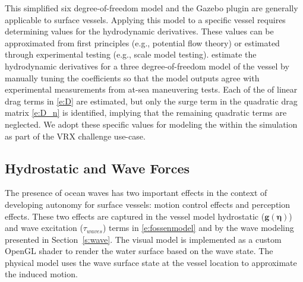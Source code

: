 \documentclass[utf8]{frontiersSCNS} %
\begin{document}
This simplified six degree-of-freedom model and the Gazebo plugin are generally applicable to surface vessels. Applying this model to a specific vessel requires determining values for the hydrodynamic derivatives. These values can be approximated from first principles (e.g., potential flow theory) or estimated through experimental testing (e.g., scale model testing). \citet{sarda16station} estimate the hydrodynamic derivatives for a three degree-of-freedom model of the \wamv{} vessel by manually tuning the coefficients so that the model outputs agree with experimental measurements from at-sea maneuvering tests. Each of the of linear drag terms in  \eqref{e:D} are estimated, but only the surge term in the quadratic drag matrix \eqref{e:D_n} is identified, implying that the remaining quadratic terms are neglected. We adopt these specific values for modeling the \wamv{} within the simulation as part of the VRX challenge use-case.\\

\subsection{Hydrostatic and Wave Forces}
The presence of ocean waves has two important effects in the context of developing autonomy for surface vessels: motion control effects and perception effects. These two effects are captured in the vessel model hydrostatic  ($\bm{g}(\bm{\eta})$) and wave excitation ($\tau_{waves}$) terms in  \eqref{e:fossenmodel} and by the wave modeling presented in Section~\ref{s:wave}. The visual model is implemented as a custom OpenGL shader to render the water surface based on the wave state. The physical model uses the wave surface state at the vessel location to approximate the induced motion. 
\end{document}
